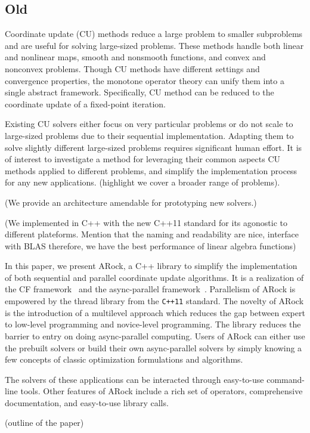 \subsection{Old}
Coordinate update (CU) methods reduce a large problem to smaller subproblems and are useful for solving large-sized problems.
These methods handle both linear and nonlinear maps, smooth and nonsmooth functions, and convex and nonconvex problems. 
Though CU methods have different settings and convergence properties,  the monotone operator theory can unify them into a single abstract framework. 
Specifically, CU method can be reduced to the coordinate update of a fixed-point iteration. 


Existing CU solvers \citep{hsieh2015passcode,jaggi2014communication,recht2011hogwild} either focus on very particular problems or do not scale to large-sized problems due to their sequential implementation. 
Adapting them to solve slightly different large-sized problems requires significant human effort. 
It is of interest to investigate a method for leveraging their common aspects CU methods applied to different problems, and simplify the implementation process for any new applications. (highlight we cover a broader range of problems).

(We provide an architecture amendable for prototyping new solvers.)

(We implemented in C++ with the new C++11 standard for its agonostic to different plateforms. Mention that the naming and readability are nice, interface with BLAS therefore, we have the best performance of linear algebra functions) 

In this paper, we present ARock, a C++ library to simplify the implementation of both sequential and parallel coordinate update algorithms. It is a realization of the CF framework~\citep{peng2016coordinate} and the async-parallel framework~\citep{peng2015arock}. Parallelism of ARock is empowered by the thread library from the \texttt{C++11} standard. The novelty of ARock is the introduction of a multilevel approach which reduces the gap between expert to low-level programming and novice-level programming.
The library reduces the barrier to entry on doing async-parallel computing. 
Users of ARock can either use the prebuilt solvers or build their own async-parallel solvers by simply knowing a few concepts of classic optimization formulations and algorithms.

 
The solvers of these applications can be interacted through easy-to-use command-line tools. 
Other features of ARock include a rich set of operators, comprehensive documentation, and easy-to-use library calls.



(outline of the paper)
